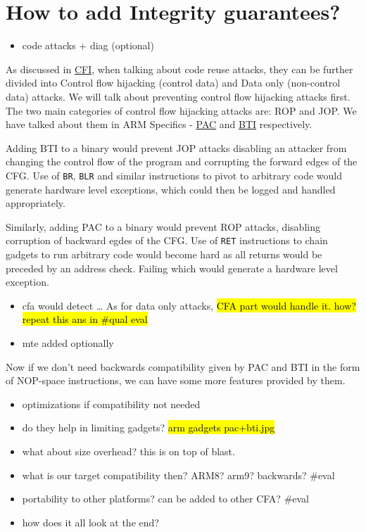 \documentclass[a4paper, nobind]{templates/ociamthesis}
\providecommand{\tightlist}{%
  \setlength{\itemsep}{0pt}\setlength{\parskip}{0pt}}
\begin{document}
\section{How to add Integrity guarantees?}\label{how-to-add-integrity-guarantees}

\begin{itemize}
\tightlist
\item
  code attacks + diag (optional)
\end{itemize}

As discussed in \hyperref[cfi]{CFI}, when talking about code reuse attacks, they can be further divided into
Control flow hijacking (control data) and Data only (non-control data) attacks.
We will talk about preventing control flow hijacking attacks first.
The two main categories of control flow hijacking attacks are: ROP and JOP.
We have talked about them in ARM Specifics - \hyperref[pac-bg]{PAC} and \hyperref[bti-bg]{BTI} respectively.

Adding BTI to a binary would prevent JOP attacks disabling an attacker from changing
the control flow of the program and corrupting the forward edges of the CFG.
Use of \texttt{BR}, \texttt{BLR} and similar instructions to pivot to arbitrary code would generate hardware
level exceptions, which could then be logged and handled appropriately.

Similarly, adding PAC to a binary would prevent ROP attacks, disabling corruption
of backward egdes of the CFG.
Use of \texttt{RET} instructions to chain gadgets to run arbitrary code would become hard
as all returns would be preceded by an address check. Failing which would generate
a hardware level exception.

\begin{itemize}
\item
  cfa would detect \ldots{}
  As for data only attacks, \hl{CFA part would handle it. how? repeat this ans in \#qual eval}
\item
  mte added optionally
\end{itemize}

Now if we don't need backwards compatibility given by PAC and BTI in the form of
NOP-space instructions, we can have some more features provided by them.

\begin{itemize}
\tightlist
\item
  optimizations if compatibility not needed
\item
  do they help in limiting gadgets?
  \hl{arm gadgets pac+bti.jpg}
\item
  what about size overhead?
  this is on top of blast.
\item
  what is our target compatibility then?
  ARM8? arm9? backwards? \#eval
\item
  portability to other platforms? can be added to other CFA? \#eval
\item
  how does it all look at the end?
\end{itemize}
\end{document}

